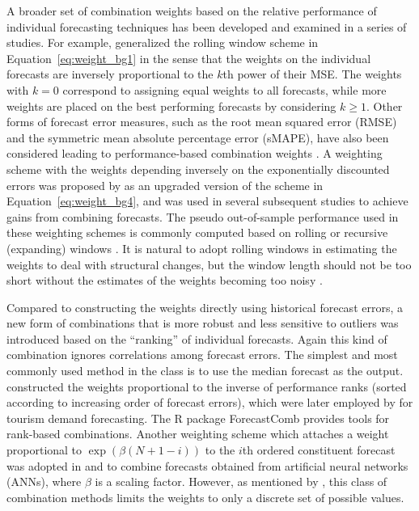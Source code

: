 \documentclass[a4paper,11pt]{article}
\newcommand{\pkg}[1]{{\normalfont\fontseries{b}\selectfont #1}}
\let\proglang=\textsf
\begin{document}
A broader set of combination weights based on the relative performance of individual forecasting techniques has been developed and examined in a series of studies. For example, \citet{Stock1998-np} generalized the rolling window scheme in Equation~\eqref{eq:weight_bg1} in the sense that the weights on the individual forecasts are inversely proportional to the $k$th power of their MSE. The weights with $k = 0$ correspond to assigning equal weights to all forecasts, while more weights are placed on the best performing forecasts by considering $k \geq 1$. Other forms of forecast error measures, such as the root mean squared error (RMSE) and the symmetric mean absolute percentage error (sMAPE), have also been considered leading to performance-based combination weights \citep[e.g.,][]{Nowotarski2014-ev,Pawlikowski2020-hm}. A weighting scheme with the weights depending inversely on the exponentially discounted errors was proposed by \citet{Stock2004-rq} as an upgraded version of the scheme in Equation~\eqref{eq:weight_bg4}, and was used in several subsequent studies \citep[e.g.,][]{Clark2010-jx,Genre2013-ut} to achieve gains from combining forecasts. The pseudo out-of-sample performance used in these weighting schemes is commonly computed based on rolling or recursive (expanding) windows \citep[e.g.,][]{Stock1998-np,Clark2010-jx,Genre2013-ut}. It is natural to adopt rolling windows in estimating the weights to deal with structural changes, but the window length should not be too short without the estimates of the weights becoming too noisy \citep{Baumeister2015-ft}.

Compared to constructing the weights directly using historical forecast errors, a new form of combinations that is more robust and less sensitive to outliers was introduced based on the ``ranking'' of individual forecasts. Again this kind of combination ignores correlations among forecast errors. The simplest and most commonly used method in the class is to use the median forecast as the output. \citet{Aiolfi2006-rh} constructed the weights proportional to the inverse of performance ranks (sorted according to increasing order of forecast errors), which were later employed by \citet{Andrawis2011-kb} for tourism demand forecasting. The \proglang{R} package \pkg{ForecastComb} \citep{rForecastComb} provides tools for rank-based combinations. Another weighting scheme which attaches a weight proportional to $\exp(\beta(N+1-i))$ to the $i$th ordered constituent forecast was adopted in \citet{Yao2008-or} and \citet{Donate2013-lq} to combine forecasts obtained from artificial neural networks (ANNs), where $\beta$ is a scaling factor. However, as mentioned by \citet{Andrawis2011-kb}, this class of combination methods limits the weights to only a discrete set of possible values.
\end{document}
